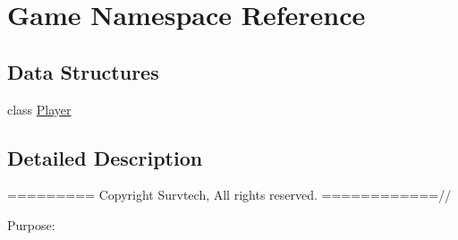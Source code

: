 \hypertarget{namespace_game}{}\section{Game Namespace Reference}
\label{namespace_game}
\subsection*{Data Structures}
\begin{DoxyCompactItemize}
\item 
class \hyperlink{class_game_1_1_player}{Player}
\end{DoxyCompactItemize}


\subsection{Detailed Description}
========= Copyright Survtech, All rights reserved. ============//

Purpose\+: 

 